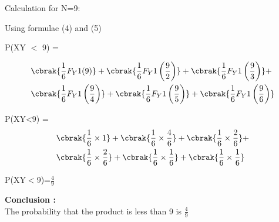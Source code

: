 \documentclass[journal,12pt]{IEEEtran}
\begin{document}
\noindent Calculation for N=9:
  
\noindent Using formulae (4) and (5)

\noindent P(XY $<$ 9) =

\noindent
\[
\begin{aligned}
&\cbrak{\frac{1}{6} F_Y1(9)} + \cbrak{\frac{1}{6} F_Y1\left(\frac{9}{2}\right)} + \cbrak{\frac{1}{6} F_Y1\left(\frac{9}{3}\right)} + \\
&\cbrak{\frac{1}{6} F_Y1\left(\frac{9}{4}\right)} + \cbrak{\frac{1}{6} F_Y1\left(\frac{9}{5}\right)} + \cbrak{\frac{1}{6} F_Y1\left(\frac{9}{6}\right)}
\end{aligned}
\]

\noindent P(XY<9) =
\[
\begin{aligned}
&\cbrak{\frac{1}{6} \times 1} + \cbrak{\frac{1}{6} \times \frac{4}{6}} + \cbrak{\frac{1}{6} \times \frac{2}{6}} + \\
&\cbrak{\frac{1}{6} \times \frac{2}{6}} + \cbrak{\frac{1}{6} \times \frac{1}{6}} + \cbrak{\frac{1}{6} \times \frac{1}{6}}
\end{aligned}
\]



\noindent P(XY$<$9)=\(\frac{4}{9}\)

\textbf{Conclusion :\\}
 The probability that the product is less than 9  
 is $\frac{4}{9}$
\end{document}

